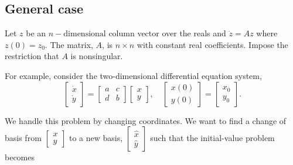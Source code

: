 \subsection{General case} %
\label{sub:general_case}

Let $z$ be an $n-\text{dimensional}$ column vector over the reals and $\dot{z}=Az$ where $z(0) = z_{0}$. The matrix, $A$, is $n\times n$ with constant real coefficients. Impose the restriction that $A$ is nonsingular.

For example, consider the two-dimensional differential equation system,
\begin{equation*}
\begin{bmatrix}
\dot{x}\\
\dot{y}
\end{bmatrix}
= \begin{bmatrix}
a & c\\
d & b
\end{bmatrix}
\begin{bmatrix}
x\\
y
\end{bmatrix},
\quad
\begin{bmatrix}
x(0)\\
y(0)
\end{bmatrix}
= \begin{bmatrix}
x_{0}\\
y_{0}
\end{bmatrix}.
\end{equation*}

We handle this problem by changing coordinates. We want to find a change of basis from
$\begin{bmatrix}
x\\y
\end{bmatrix}$
to a new basis,
$\begin{bmatrix}
\hat{x}\\
\hat{y}
\end{bmatrix}$
such that the initial-value problem becomes


